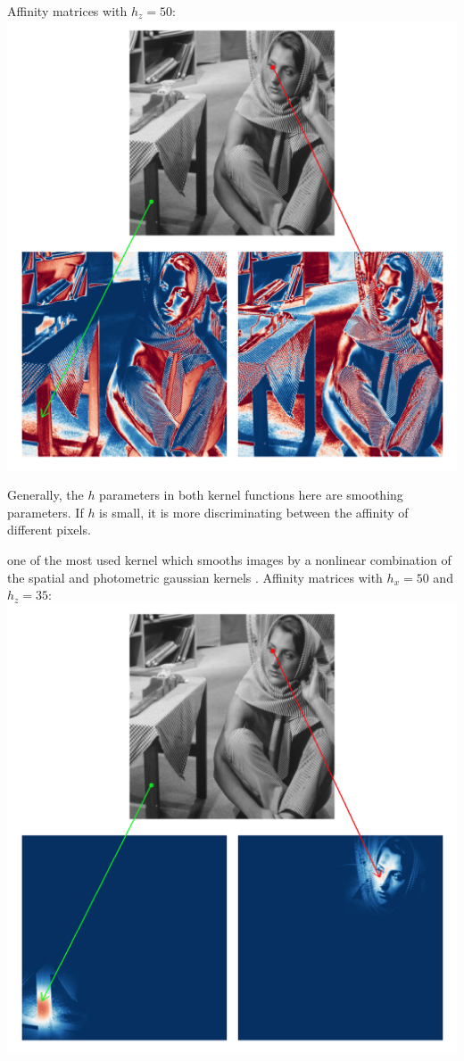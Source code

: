 \begin{description}[align=left]
  Affinity matrices with \(h_z = 50\): \\
  \includegraphics[width=\textwidth]{img/photometricAffinitySigma50.png}

  Generally, the \(h\) parameters in both kernel functions here are smoothing parameters.
  If \(h\) is small, it is more discriminating between the affinity of different pixels.

 \item [Bilateral Kernel] one of the most used kernel which smooths images by a nonlinear combination of the spatial and photometric gaussian kernels \cite{siam_slides_2016} \cite{glide_2014}.
  Affinity matrices with \(h_x = 50\) and \(h_z = 35\): \\
  \includegraphics[width=\textwidth]{img/bilateralAffinityPhoto35Spatial50.png}


\end{description}
